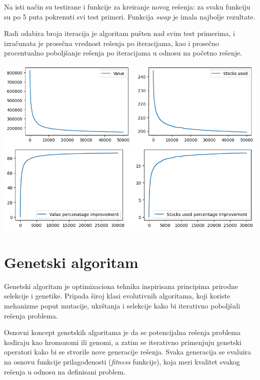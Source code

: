 \documentclass[12pt, a4paper]{article}
\begin{document}
Na isti način su testirane i funkcije za kreiranje novog rešenja: za svaku funkciju su po 5 puta pokrenuti svi test primeri. Funkcija \textit{swap} je imala najbolje rezultate.

Radi odabira broja iteracija je algoritam pušten nad svim test primerima, i izračunata je prosečna vrednost rešenja po iteracijama, kao i prosečno procentualno poboljšanje rešenja po iteracijama u odnosu na početno rešenje.

\vspace{0.5cm}
\begin{center}
  \includegraphics[width=\linewidth]{img/sa_iters_avg.png}
  \includegraphics[width=\linewidth]{img/sa_iters_perc.png}
\end{center}
\vspace{0.5cm}

\section{Genetski algoritam}
Genetski algoritam je optimizaciona tehnika inspirisana principima prirodne selekcije i genetike. Pripada široj klasi evolutivnih algoritama, koji koriste mehanizme poput mutacije, ukrštanja i selekcije kako bi iterativno poboljšali rešenja problema.

Osnovni koncept genetskih algoritama je da se potencijalna rešenja problema kodiraju kao hromozomi ili genomi, a zatim se iterativno primenjuju genetski operatori kako bi se stvorile nove generacije rešenja. Svaka generacija se evaluira na osnovu funkcije prilagođenosti (\textit{fitness} funkcije), koja meri kvalitet svakog rešenja u odnosu na definisani problem.
\end{document}
